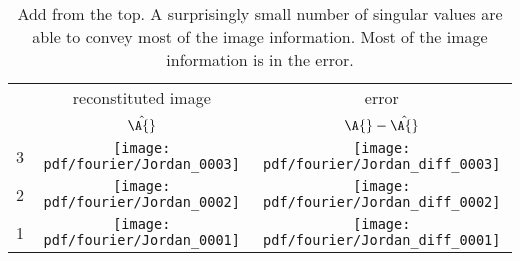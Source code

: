 \begin{table}[htdp]
\begin{center}
\begin{tabular}{ccc}
 & reconstituted image & error \\
 & $\hat{\A{}}$ & $\A{} - \hat{\A{}}$ \\
  3 & \texttt{[image: pdf/fourier/Jordan\_0003]} & \texttt{[image: pdf/fourier/Jordan\_diff\_0003]} \\
  2 & \texttt{[image: pdf/fourier/Jordan\_0002]} & \texttt{[image: pdf/fourier/Jordan\_diff\_0002]}\\
  1 & \texttt{[image: pdf/fourier/Jordan\_0001]} & \texttt{[image: pdf/fourier/Jordan\_diff\_0001]}\\
\end{tabular}
\end{center}
\label{default}
\caption[Add from the top]{Add from the top. A surprisingly small number of singular values are able to convey most of the image information. Most of the image information is in the error.}
\end{table}%

\endinput

\subsection{A look at Camille Jordan}
We really have a knack for faces.

The singular values are all set to unity
\begin{equation}
  \sig{} = \mat{c}{\I{470}\\\zero}.
\end{equation}
\begin{equation}
  \sig{-1} = \mat{cc}{\I{470}&\zero}.
\end{equation}


\begin{figure}[htbp] %
   \centering
   \texttt{[image: pdf/fourier/Jordan\_shadow]} \\[5pt]
   $\A{} = \Y{} \mat{c}{\I{470}\\\zero} \X{T}$
   \caption{Replace the singular values spectrum with units. }
   \label{fig:fourier:Hilbert:unit}
\end{figure}

\begin{figure}[htbp] %
   \centering
   \texttt{[image: pdf/fourier/Jordan\_shadow\_pi]}  \\[5pt]
   $\A{T} = \X{} \mat{cc}{\I{470} & \zero} \Y{T}$
   \caption[The inverse is readily available and is the transpose]{The inverse is readily available and is the transpose. $\A{} = \X{} \Y{T}$}
   \label{fig:fourier:Hilbert:pi}
\end{figure}

